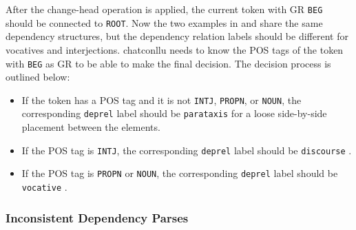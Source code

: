 After the change-head operation is applied, the current token with GR \texttt{BEG} should be connected to \texttt{ROOT}. Now the two examples in  and  share the same dependency structures, but the dependency relation labels should be different for vocatives and interjections. chatconllu needs to know the POS tags of the token with \texttt{BEG} as GR to be able to make the final decision. The decision process is outlined below:\\

\begin{itemize}
    \item If the token has a POS tag and it is not \texttt{INTJ}, \texttt{PROPN}, or \texttt{NOUN}, the corresponding \texttt{deprel}  label should be \texttt{parataxis} for a loose side-by-side placement between the elements.
    \item If the POS tag is \texttt{INTJ}, the corresponding \texttt{deprel} label should be \texttt{discourse} .
    \item If the POS tag is \texttt{PROPN} or \texttt{NOUN}, the corresponding \texttt{deprel} label should be \texttt{vocative} .
\end{itemize}

\subsubsection{Inconsistent Dependency Parses}

